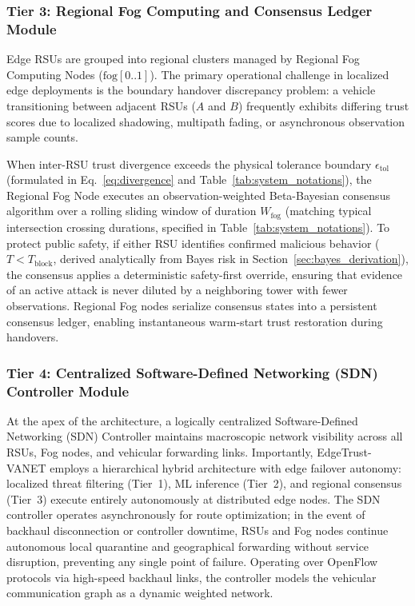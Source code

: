 \documentclass[conference]{IEEEtran}
\begin{document}
\subsubsection{Tier 3: Regional Fog Computing and Consensus Ledger Module}
Edge RSUs are grouped into regional clusters managed by Regional Fog Computing Nodes ($\text{fog}[0..1]$). The primary operational challenge in localized edge deployments is the boundary handover discrepancy problem: a vehicle transitioning between adjacent RSUs ($A$ and $B$) frequently exhibits differing trust scores due to localized shadowing, multipath fading, or asynchronous observation sample counts. 

When inter-RSU trust divergence exceeds the physical tolerance boundary $\epsilon_{\text{tol}}$ (formulated in Eq.~\ref{eq:divergence} and Table~\ref{tab:system_notations}), the Regional Fog Node executes an observation-weighted Beta-Bayesian consensus algorithm over a rolling sliding window of duration $W_{\text{fog}}$ (matching typical intersection crossing durations, specified in Table~\ref{tab:system_notations}). To protect public safety, if either RSU identifies confirmed malicious behavior ($T < T_{\text{block}}$, derived analytically from Bayes risk in Section~\ref{sec:bayes_derivation}), the consensus applies a deterministic safety-first override, ensuring that evidence of an active attack is never diluted by a neighboring tower with fewer observations. Regional Fog nodes serialize consensus states into a persistent consensus ledger, enabling instantaneous warm-start trust restoration during handovers.

\subsubsection{Tier 4: Centralized Software-Defined Networking (SDN) Controller Module}
At the apex of the architecture, a logically centralized Software-Defined Networking (SDN) Controller maintains macroscopic network visibility across all RSUs, Fog nodes, and vehicular forwarding links. Importantly, EdgeTrust-VANET employs a hierarchical hybrid architecture with edge failover autonomy: localized threat filtering (Tier~1), ML inference (Tier~2), and regional consensus (Tier~3) execute entirely autonomously at distributed edge nodes. The SDN controller operates asynchronously for route optimization; in the event of backhaul disconnection or controller downtime, RSUs and Fog nodes continue autonomous local quarantine and geographical forwarding without service disruption, preventing any single point of failure. Operating over OpenFlow protocols via high-speed backhaul links, the controller models the vehicular communication graph as a dynamic weighted network. 
\end{document}
